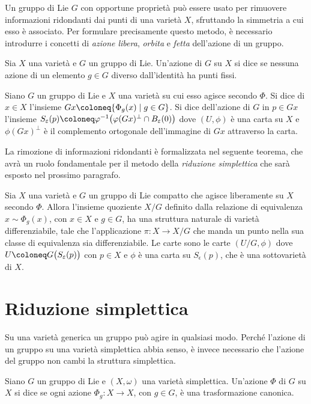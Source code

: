 Un gruppo di Lie $G$ con opportune proprietà può essere usato per rimuovere informazioni ridondanti dai punti di una varietà $X$, sfruttando la simmetria a cui esso è associato. Per formulare precisamente questo metodo, è necessario introdurre i concetti di \emph{azione libera}, \emph{orbita} e \emph{fetta} dell'azione di un gruppo.
\begin{definition}
  Sia $X$ una varietà e $G$ un gruppo di Lie. Un'azione di $G$ su $X$ si dice  se nessuna azione di un elemento $g \in G$ diverso dall'identità ha punti fissi.
\end{definition}
\begin{definition}
  Siano $G$ un gruppo di Lie e $X$ una varietà su cui esso agisce secondo $\Phi$. Si dice  di $x \in X$ l'insieme $Gx \defeq \{ \Phi_g(x)\mid g \in G\}$. Si dice  dell'azione di $G$ in $p \in Gx$ l'insieme $S_{\epsilon}(p) \defeq \phi^{-1}\big(\phi(Gx)^{\perp} \cap B_{\epsilon}(0)\big)$ dove $(U,\phi)$ è una carta su $X$ e $\phi(Gx)^{\perp}$ è il complemento ortogonale dell'immagine di $Gx$ attraverso la carta.
\end{definition}

La rimozione di informazioni ridondanti è formalizzata nel seguente teorema, che avrà un ruolo fondamentale per il metodo della \emph{riduzione simplettica} che sarà esposto nel prossimo paragrafo.
\begin{theorem}
  Sia $X$ una varietà e $G$ un gruppo di Lie compatto che agisce liberamente su $X$ secondo $\Phi$. Allora l'insieme quoziente $X/G$ definito dalla relazione di equivalenza $x \sim \Phi_g(x)$, con $x \in X$ e $g \in G$, ha una struttura naturale di varietà differenziabile, tale che l'applicazione $\pi:X \to X /G$ che manda un punto nella sua classe di equivalenza sia differenziabile. Le carte sono le carte $(U/G,\phi)$ dove $U \defeq G\big(S_{\epsilon}(p)\big)$ con $p \in X$ e $\phi$ è una carta su $S_{\epsilon}(p)$, che è una sottovarietà di $X$.
\end{theorem}

\section{Riduzione simplettica}
Su una varietà generica un gruppo può agire in qualsiasi modo. Perché l'azione di un gruppo su una varietà simplettica abbia senso, è invece necessario che l'azione del gruppo non cambi la struttura simplettica.
\begin{definition}
  Siano $G$ un gruppo di Lie e $(X, \omega)$ una varietà simplettica. Un'azione $\Phi$ di $G$ su $X$ si dice  se ogni azione $\Phi_g:X\to X$, con $g \in G$, è una trasformazione canonica.
\end{definition}

